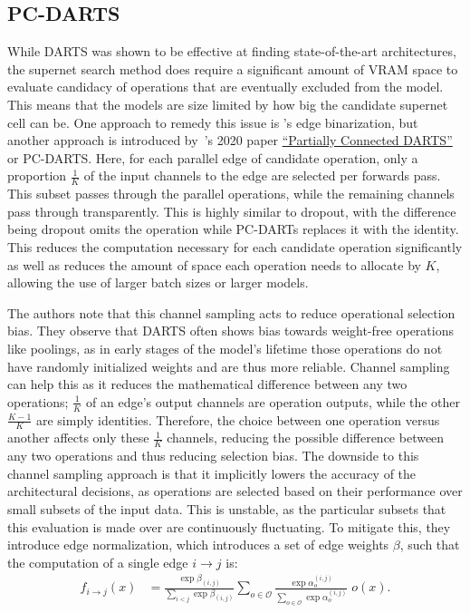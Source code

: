 \subsection{PC-DARTS}
While DARTS was shown to be effective at finding state-of-the-art architectures, the supernet search method does require
a significant amount of VRAM space to evaluate candidacy of operations that are eventually excluded from the model. This
means that the models are size limited by how big the candidate supernet cell can be. One approach to remedy this
issue is \citeauthor{cai2018}'s edge binarization, but another approach is introduced by~\citeauthor{xu2020}'s 2020 paper
\hyperlink{cite.xu2020}{``Partially Connected DARTS''}~ or PC-DARTS. Here, for each parallel edge of candidate
operation, only a proportion $\frac{1}{K}$ of the input channels to the edge are selected per forwards pass.
This subset passes through the parallel operations, while the remaining channels pass through transparently.
This is highly similar to dropout, with the difference being dropout omits the operation while PC-DARTs replaces it with the
identity. This reduces the computation necessary for each candidate operation significantly as well as reduces the amount
of space each operation needs to allocate by $K$, allowing the use of larger batch sizes or larger models.

The authors note that this channel sampling acts to reduce operational selection bias. They observe that DARTS often
shows bias towards weight-free operations like poolings, as in early stages of the model's lifetime those operations
do not have randomly initialized weights and are thus more reliable. Channel sampling can help this as it reduces
the mathematical difference
between any two operations; $\frac{1}{K}$ of an edge's output channels are operation outputs, while the
other $\frac{K-1}{K}$ are simply identities. Therefore, the choice between one operation versus another affects only
these $\frac{1}{K}$ channels, reducing the possible difference between any two
operations and thus reducing selection bias. The downside to this channel sampling approach is that it implicitly lowers the accuracy of the architectural decisions,
as operations are selected based on their performance over small subsets of the input data. This is unstable, as the
particular subsets that this evaluation is made over are continuously fluctuating. To mitigate this, they introduce
edge normalization, which introduces a set of edge weights $\beta$, such that the computation of a single edge
$i\rightarrow j$ is:
\begin{align}
    f_{i \rightarrow j}(x) &= \frac{\exp \beta_{(i,j)}}{\sum_{i < j}\exp\beta_{(i,j)}} \sum_{o \in \mathcal{O}} \frac{\exp\alpha_o^{(i,j)}}{\sum_{o \in \mathcal{O}}\exp\alpha_o^{(i,j)}} \; o(x).
\end{align}

